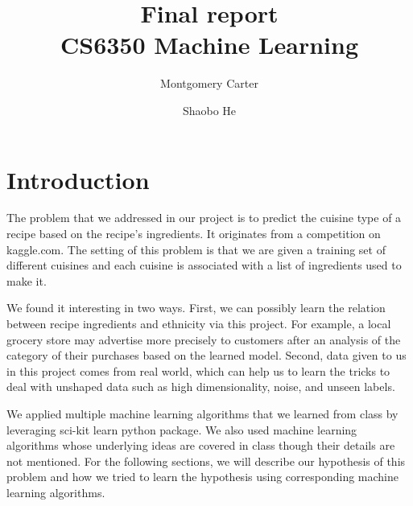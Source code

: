 \documentclass[11pt]{article}
\title{Final report\\CS6350 Machine Learning}
\author{Montgomery Carter \and Shaobo He}
\begin{document}
\maketitle

\section{Introduction}
The problem that we addressed in our project is to predict the cuisine type of a
recipe based on the recipe's ingredients. It originates from a competition on kaggle.com\cite{kaggle-link}. The setting of this problem is that we are given a training set of different cuisines and each cuisine is associated with a list of ingredients used to make it.

We found it interesting in two ways. First, we can possibly learn the relation between recipe ingredients and ethnicity via this project. For example, a local grocery store may advertise more precisely to customers after an analysis of the category of their purchases based on the learned model. Second, data given to us in this project comes from real world, which can help us to learn the tricks to deal with unshaped data such as high dimensionality, noise, and unseen labels.

We applied multiple machine learning algorithms that we learned from class by leveraging sci-kit learn python package. We also used machine learning algorithms whose underlying ideas are covered in class though their details are not mentioned. For the following sections, we will describe our hypothesis of this problem and how we tried to learn the hypothesis using corresponding machine learning algorithms.



\end{document}
